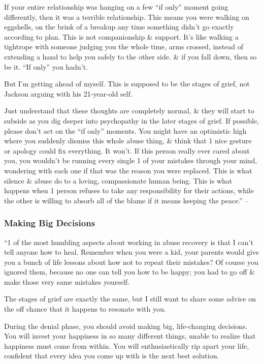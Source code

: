\documentclass{article}
\numberwithin{equation}{section}
\begin{document}
If your entire relationship was hanging on a few ``if only'' moment going differently, then it was a terrible relationship. This means you were walking on eggshells, on the brink of a breakup any time something didn't go exactly according to plan. This is not companionship \& support. It's like walking a tightrope with someone judging you the whole time, arms crossed, instead of extending a hand to help you safely to the other side. \& if you fall down, then so be it. ``If only'' you hadn't.

But I'm getting ahead of myself. This is supposed to be the stages of grief, not Jackson arguing with his 21-year-old self.

Just understand that these thoughts are completely normal, \& they will start to subside as you dig deeper into psychopathy in the later stages of grief. If possible, please don't act on the ``if only'' moments. You might have an optimistic high where you suddenly dismiss this whole abuse thing, \& think that 1 nice gesture or apology could fix everything. It won't. If this person really ever cared about you, you wouldn't be running every single 1 of your mistakes through your mind, wondering with each one if that was the reason you were replaced. This is what silence \& abuse do to a loving, compassionate human being. This is what happens when 1 person refuses to take any responsibility for their actions, while the other is willing to absorb all of the blame if it means keeping the peace.'' -- \cite[pp. 96--98]{MacKenzie2015}

\subsubsection{Making Big Decisions}
``1 of the most humbling aspects about working in abuse recovery is that I can't tell anyone how to heal. Remember when you were a kid, your parents would give you a bunch of life lessons about how not to repeat their mistakes? Of course you ignored them, because no one can tell you how to be happy; you had to go off \& make those very same mistakes yourself.

The stages of grief are exactly the same, but I still want to share some advice on the off chance that it happens to resonate with you.

During the denial phase, you should avoid making big, life-changing decisions. You will invest your happiness in so many different things, unable to realize that happiness must come from within. You will enthusiastically rip apart your life, confident that every idea you come up with is the next best solution.
\end{document}
